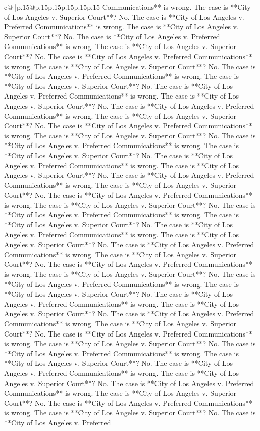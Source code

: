 \documentclass{article}
\begin{document}
{\begin{supertabular}{c@{$\;$}|p{.15\linewidth}@{}p{.15\linewidth}p{.15\linewidth}p{.15\linewidth}p{.15\linewidth}p{.15\linewidth}}
{{{Communications** is wrong. The case is **City of Los Angeles v. Superior Court**? No. The case is **City of Los Angeles v. Preferred Communications** is wrong. The case is **City of Los Angeles v. Superior Court**? No. The case is **City of Los Angeles v. Preferred Communications** is wrong. The case is **City of Los Angeles v. Superior Court**? No. The case is **City of Los Angeles v. Preferred Communications** is wrong. The case is **City of Los Angeles v. Superior Court**? No. The case is **City of Los Angeles v. Preferred Communications** is wrong. The case is **City of Los Angeles v. Superior Court**? No. The case is **City of Los Angeles v. Preferred Communications** is wrong. The case is **City of Los Angeles v. Superior Court**? No. The case is **City of Los Angeles v. Preferred Communications** is wrong. The case is **City of Los Angeles v. Superior Court**? No. The case is **City of Los Angeles v. Preferred Communications** is wrong. The case is **City of Los Angeles v. Superior Court**? No. The case is **City of Los Angeles v. Preferred Communications** is wrong. The case is **City of Los Angeles v. Superior Court**? No. The case is **City of Los Angeles v. Preferred Communications** is wrong. The case is **City of Los Angeles v. Superior Court**? No. The case is **City of Los Angeles v. Preferred Communications** is wrong. The case is **City of Los Angeles v. Superior Court**? No. The case is **City of Los Angeles v. Preferred Communications** is wrong. The case is **City of Los Angeles v. Superior Court**? No. The case is **City of Los Angeles v. Preferred Communications** is wrong. The case is **City of Los Angeles v. Superior Court**? No. The case is **City of Los Angeles v. Preferred Communications** is wrong. The case is **City of Los Angeles v. Superior Court**? No. The case is **City of Los Angeles v. Preferred Communications** is wrong. The case is **City of Los Angeles v. Superior Court**? No. The case is **City of Los Angeles v. Preferred Communications** is wrong. The case is **City of Los Angeles v. Superior Court**? No. The case is **City of Los Angeles v. Preferred Communications** is wrong. The case is **City of Los Angeles v. Superior Court**? No. The case is **City of Los Angeles v. Preferred Communications** is wrong. The case is **City of Los Angeles v. Superior Court**? No. The case is **City of Los Angeles v. Preferred Communications** is wrong. The case is **City of Los Angeles v. Superior Court**? No. The case is **City of Los Angeles v. Preferred Communications** is wrong. The case is **City of Los Angeles v. Superior Court**? No. The case is **City of Los Angeles v. Preferred Communications** is wrong. The case is **City of Los Angeles v. Superior Court**? No. The case is **City of Los Angeles v. Preferred Communications** is wrong. The case is **City of Los Angeles v. Superior Court**? No. The case is **City of Los Angeles v. Preferred Communications** is wrong. The case is **City of Los Angeles v. Superior Court**? No. The case is **City of Los Angeles v. Preferred Communications** is wrong. The case is **City of Los Angeles v. Superior Court**? No. The case is **City of Los Angeles v. Preferred }}}
\end{supertabular}}
\end{document}
